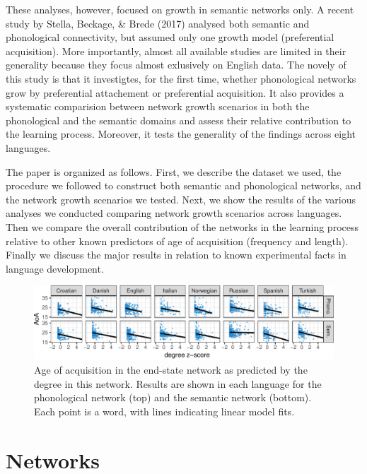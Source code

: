\documentclass[10pt, letterpaper]{article}
\newenvironment{CodeChunk}{}{}
\begin{document}
These analyses, however, focused on growth in semantic networks only. A
recent study by Stella, Beckage, \& Brede (2017) analysed both semantic
and phonological connectivity, but assumed only one growth model
(preferential acquisition). More importantly, almost all available
studies are limited in their generality because they focus almost
exlusively on English data. The novely of this study is that it
investigtes, for the first time, whether phonological networks grow by
preferential attachement or preferential acquisition. It also provides a
systematic comparision between network growth scenarios in both the
phonological and the semantic domains and assess their relative
contribution to the learning process. Moreover, it tests the generality
of the findings across eight languages.

The paper is organized as follows. First, we describe the dataset we
used, the procedure we followed to construct both semantic and
phonological networks, and the network growth scenarios we tested. Next,
we show the results of the various analyses we conducted comparing
network growth scenarios across languages. Then we compare the overall
contribution of the networks in the learning process relative to other
known predictors of age of acquisition (frequency and length). Finally
we discuss the major results in relation to known experimental facts in
language development.

\begin{CodeChunk}
\begin{figure}[h]

{\centering \includegraphics{figs/all_data-1} 

}

\caption{\label{fig:data_all}Age of acquisition in the end-state network as predicted by the degree in this network. Results are shown in each language for the phonological network (top) and the semantic network (bottom). Each point is a word, with lines indicating linear model fits.}\label{fig:all_data}
\end{figure}
\end{CodeChunk}

\section{Networks}\label{networks}
\end{document}
